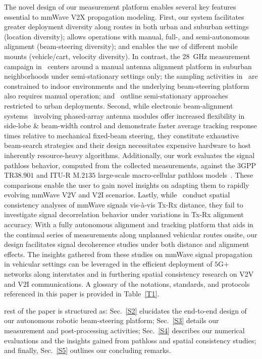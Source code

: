 \documentclass[10pt, twocolumn]{IEEEtran}
\begin{document}
The novel design of our measurement platform enables several key features essential to mmWave V2X propagation modeling. First, our system facilitates greater deployment diversity along routes in both urban and suburban settings (location diversity); allows operations with manual, full-, and semi-autonomous alignment (beam-steering diversity); and enables the use of different mobile mounts (vehicle/cart, velocity diversity). In contrast, the \SI{28}{\giga\hertz} measurement campaign in~\cite{Purdue} centers around a manual antenna alignment platform in suburban neighborhoods under semi-stationary settings only; the sampling activities in~\cite{Harvard} are constrained to indoor environments and the underlying beam-steering platform also requires manual operation; and~\cite{MolischSpatialOutdoor, Outdoor28G} outline semi-stationary approaches restricted to urban deployments. Second, while electronic beam-alignment systems~\cite{Agile-Link} involving phased-array antenna modules offer increased flexibility in side-lobe \& beam-width control and demonstrate faster average tracking response times relative to mechanical fixed-beam steering, they constitute exhaustive beam-search strategies and their design necessitates expensive hardware to host inherently resource-heavy algorithms. Additionally, our work evaluates the signal pathloss behavior, computed from the collected measurements, against the $3$GPP TR$38.901$ and ITU-R M$.2135$ large-scale macro-cellular pathloss models~\cite{MacCartneyModelsOverview}. These comparisons enable the user to gain novel insights on adapting them to rapidly evolving mmWave V$2$V and V$2$I scenarios. Lastly, while~\cite{MolischSpatialOutdoor, MacCartneySpatialStatistics} conduct spatial consistency analyses of mmWave signals vis-\`{a}-vis Tx-Rx distance, they fail to investigate signal decorrelation behavior under variations in Tx-Rx alignment accuracy. With a fully autonomous alignment and tracking platform that aids in the continual series of measurements along unplanned vehicular routes onsite, our design facilitates signal decoherence studies under both distance and alignment effects. The insights gathered from these studies on mmWave signal propagation in vehicular settings can be leveraged in the efficient deployment of $5$G$+$ networks along interstates and in furthering spatial consistency research on V$2$V and V$2$I communications. A glossary of the notations, standards, and protocols referenced in this paper is provided in Table~\ref{T1}.

 rest of the paper is structured as: Sec.~\ref{S2} elucidates the end-to-end design of our autonomous robotic beam-steering platform; Sec.~\ref{S3} details our measurement and post-processing activities; Sec.~\ref{S4} describes our numerical evaluations and the insights gained from pathloss and spatial consistency studies; and finally, Sec.~\ref{S5} outlines our concluding remarks.
\vspace{-3mm}
\end{document}
